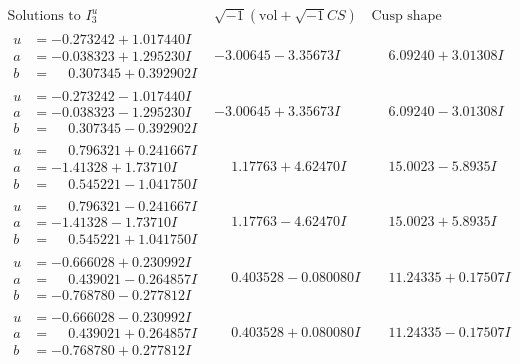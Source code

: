 \documentclass[1p]{elsarticle_modified}
\theoremstyle{definition}
\newcommand{\I}{\sqrt{-1}}
\begin{document}
$$\begin{array}{c|c|c}  
\text{Solutions to }I^u_{3}& \I (\text{vol} + \sqrt{-1}CS) & \text{Cusp shape}\\
 \hline 
\begin{aligned}
u &= -0.273242 + 1.017440 I \\
a &= -0.038323 + 1.295230 I \\
b &= \phantom{-}0.307345 + 0.392902 I\end{aligned}
 & -3.00645 - 3.35673 I & \phantom{-}6.09240 + 3.01308 I \\ \hline\begin{aligned}
u &= -0.273242 - 1.017440 I \\
a &= -0.038323 - 1.295230 I \\
b &= \phantom{-}0.307345 - 0.392902 I\end{aligned}
 & -3.00645 + 3.35673 I & \phantom{-}6.09240 - 3.01308 I \\ \hline\begin{aligned}
u &= \phantom{-}0.796321 + 0.241667 I \\
a &= -1.41328 + 1.73710 I \\
b &= \phantom{-}0.545221 - 1.041750 I\end{aligned}
 & \phantom{-}1.17763 + 4.62470 I & \phantom{-}15.0023 - 5.8935 I \\ \hline\begin{aligned}
u &= \phantom{-}0.796321 - 0.241667 I \\
a &= -1.41328 - 1.73710 I \\
b &= \phantom{-}0.545221 + 1.041750 I\end{aligned}
 & \phantom{-}1.17763 - 4.62470 I & \phantom{-}15.0023 + 5.8935 I \\ \hline\begin{aligned}
u &= -0.666028 + 0.230992 I \\
a &= \phantom{-}0.439021 - 0.264857 I \\
b &= -0.768780 - 0.277812 I\end{aligned}
 & \phantom{-}0.403528 - 0.080080 I & \phantom{-}11.24335 + 0.17507 I \\ \hline\begin{aligned}
u &= -0.666028 - 0.230992 I \\
a &= \phantom{-}0.439021 + 0.264857 I \\
b &= -0.768780 + 0.277812 I\end{aligned}
 & \phantom{-}0.403528 + 0.080080 I & \phantom{-}11.24335 - 0.17507 I \\ \hline\begin{aligned}

\end{aligned}
\end{array}$$
\end{document}
